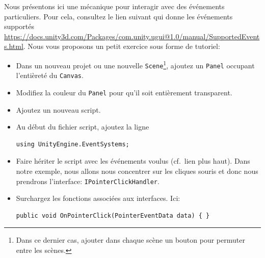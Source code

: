 \documentclass[a4paper,10pt]{article}
\begin{document}
Nous présentons ici une mécanique pour interagir avec des événements particuliers. Pour cela, consultez le lien suivant qui donne les événements supportés \url{https://docs.unity3d.com/Packages/com.unity.ugui@1.0/manual/SupportedEvents.html}. Nous vous proposons un petit exercice sous forme de tutoriel:
\begin{itemize}
	\item Dans un nouveau projet ou une nouvelle \texttt{Scene}\footnote{Dans ce dernier cas, ajouter dans chaque scène un bouton pour permuter entre les scènes.}, ajoutez un \texttt{Panel} occupant l'entièreté du \texttt{Canvas}.
	\item Modifiez la couleur du \texttt{Panel} pour qu'il soit entièrement transparent.
	\item Ajoutez un nouveau script.
	\item Au début du fichier script, ajoutez la ligne
\begin{lstlisting}
using UnityEngine.EventSystems;	
\end{lstlisting}	
	\item Faire hériter le script avec les événements voulus (cf.~lien plus haut). Dans notre exemple, nous allons nous concentrer sur les cliques souris et donc nous prendrons l'interface: \texttt{IPointerClickHandler}.
	\item Surchargez les fonctions associées aux interfaces. Ici: 
\begin{lstlisting}
public void OnPointerClick(PointerEventData data) { }
\end{lstlisting}		
\end{itemize}
\end{document}
